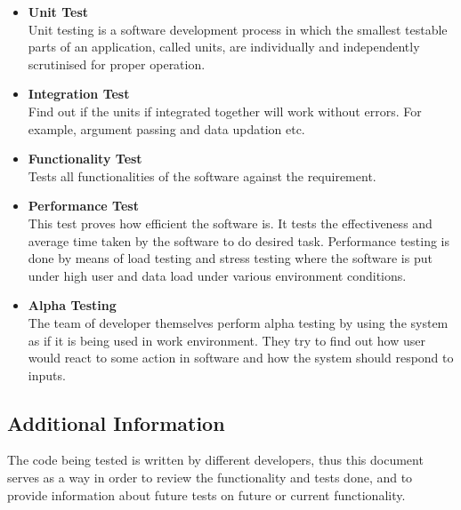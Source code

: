 \documentclass[12pt]{article}
\begin{document}
{			\begin{itemize}

				\item \textbf{Unit Test}\\
				\newline
				Unit testing is a software development process in which the smallest testable parts of an application, called units, are individually and independently scrutinised for proper operation.\\
				\item \textbf{Integration Test}\\
				\newline 
				Find out if the units if integrated together will work without errors. For example, argument passing and data updation etc.
				\item \textbf{Functionality Test}\\
				\newline 
				Tests all functionalities of the software against the requirement.
				\item \textbf{Performance Test}\\
				\newline 
				This test proves how efficient the software is. It tests the effectiveness and average time taken by the software to do desired task. Performance testing is done by means of load testing and stress testing where the software is put under high user and data load under various environment conditions.
				\item \textbf{Alpha Testing}\\
				\newline 
				The team of developer themselves perform alpha testing by using the system as if it is being used in work environment. They try to find out how user would react to some action in software and how the system should respond to inputs.

			\end{itemize}

		\subsection{Additional Information}

		The code being tested is written by different developers, thus this document serves as a way in order to review the functionality and tests done, and to provide information about future tests on future or current functionality.\\\\


}
\end{document}
